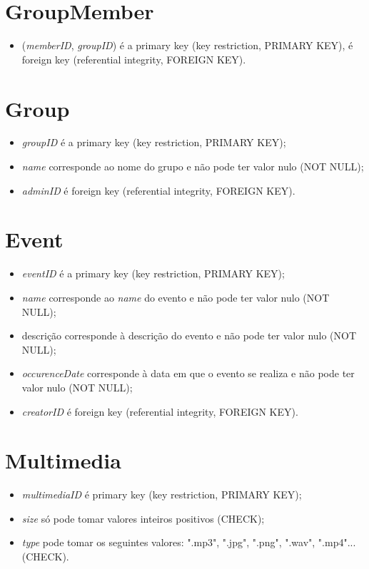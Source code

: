 \documentclass[12pt]{report}
\begin{document}
\section{GroupMember}

\begin{itemize}
    \item (\textit{memberID}, \textit{groupID}) é a primary key (key restriction, PRIMARY KEY), é foreign key (referential integrity, FOREIGN KEY).
\end{itemize}

\section{Group}

\begin{itemize}
    \item \textit{groupID} é a primary key (key restriction, PRIMARY KEY);
    \item \textit{name} corresponde ao nome do grupo e não pode ter valor nulo (NOT NULL);
    \item \textit{adminID} é foreign key (referential integrity, FOREIGN KEY).
\end{itemize}

\section{Event}

\begin{itemize}
    \item \textit{eventID} é a primary key (key restriction, PRIMARY KEY);
    \item \textit{name}  corresponde ao \textit{name} do evento e não pode ter valor nulo (NOT NULL);
    \item descrição  corresponde à descrição do evento e não pode ter valor nulo (NOT NULL);
    \item \textit{occurenceDate} corresponde à data em que o evento se realiza e não pode ter valor nulo (NOT NULL);
    \item \textit{creatorID} é foreign key (referential integrity, FOREIGN KEY).
\end{itemize}

\section{Multimedia}

\begin{itemize}
    \item \textit{multimediaID} é primary key (key restriction, PRIMARY KEY);
    \item \textit{size} só pode tomar valores inteiros positivos (CHECK);
    \item \textit{type} pode tomar os seguintes valores: ".mp3", ".jpg", ".png", ".wav", ".mp4"... (CHECK).
\end{itemize}
\end{document}
